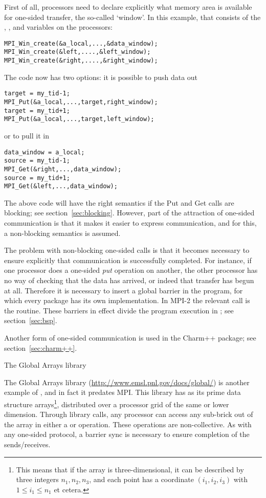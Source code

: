 First of all, processors need to declare explicitly what memory area
is available for one-sided transfer, the so-called `window'. In this
example, that consists of the , , and 
variables on the processors:
\begin{verbatim}
MPI_Win_create(&a_local,...,&data_window);
MPI_Win_create(&left,....,&left_window);
MPI_Win_create(&right,....,&right_window);
\end{verbatim}
The code now has two options: it is possible to push data out
\begin{verbatim}
target = my_tid-1;
MPI_Put(&a_local,...,target,right_window);
target = my_tid+1;
MPI_Put(&a_local,...,target,left_window);
\end{verbatim}
or to pull it in
\begin{verbatim}
data_window = a_local;
source = my_tid-1;
MPI_Get(&right,...,data_window);
source = my_tid+1;
MPI_Get(&left,...,data_window);
\end{verbatim}
The above code will have the right semantics if the Put and Get calls
are blocking; see section~\ref{sec:blocking}. However, part of the
attraction of one-sided communication is that it makes it easier to
express communication, and for this, a non-blocking semantics is
assumed. 

The problem with non-blocking one-sided calls is that it becomes
necessary to ensure explicitly that communication is successfully
completed. For instance, if one processor does a one-sided \emph{put}
operation on another, the other processor has no way of checking that
the data has arrived, or indeed that transfer has begun at
all. Therefore it is necessary to insert a global barrier in the program,
for which every package has its own implementation. In MPI-2 the
relevant call is the 
 routine. These barriers in effect divide the program
execution in ; see section~\ref{sec:bsp}.

Another form of one-sided communication is used in the Charm++
package; see section~\ref{sec:charm++}.


 {The Global Arrays library}

The Global Arrays library (\url{http://www.emsl.pnl.gov/docs/global/})
is another example of , and in fact
it predates MPI. This library has as its prime data structure
 arrays\footnote{This means that if the
  array is three-dimensional, it can be described by three integers
  $n_1,n_2,n_3$, and each point has a coordinate $(i_1,i_2,i_3)$ with
  $1\leq i_1\leq n_1$ et cetera.}, distributed over a processor grid
of the same or lower dimension. Through library calls, any processor
can access any sub-brick out of the array in either a  or
 operation. These operations are non-collective. As with any
one-sided protocol, a barrier sync is necessary to ensure completion
of the sends/receives.


